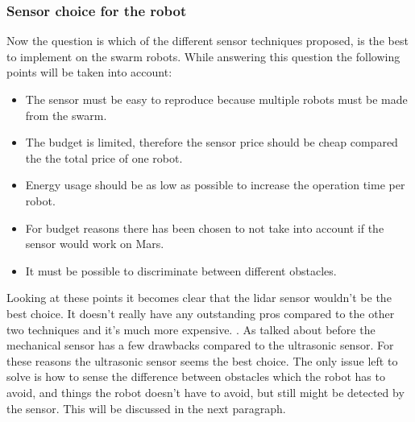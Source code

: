 \documentclass[10pt,a4paper]{article}
\begin{document}
\subsubsection{Sensor choice for the robot}
Now the question is which of the different sensor techniques proposed, is the best to implement on the swarm robots. While answering this question the following points will be taken into account:

\begin{itemize}
    \item The sensor must be easy to reproduce because multiple robots must be made from the swarm.
    \item The budget is limited, therefore the sensor price should be cheap compared the the total price of one robot.
    \item Energy usage should be as low as possible to increase the operation time per robot.
    \item For budget reasons there has been chosen to not take into account if the sensor would work on Mars.
    \item It must be possible to discriminate between different obstacles.
\end{itemize}

Looking at these points it becomes clear that the lidar sensor wouldn't be the best choice. It doesn't really have any outstanding pros compared to the other two techniques and it's much more expensive. . As talked about before the mechanical sensor has a few drawbacks compared to the ultrasonic sensor. For these reasons the ultrasonic sensor seems the best choice. The only issue left to solve is how to sense the difference between obstacles which the robot has to avoid, and things the robot doesn't have to avoid, but still might be detected by the sensor. This will be discussed in the next paragraph.
\end{document}
